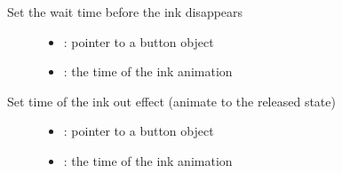 \documentclass[letterpaper,10pt,english]{sphinxmanual}
\begin{document}

\begin{fulllineitems}
\label{\detokenize{object-types/btn:_CPPv424lv_btn_set_ink_wait_timeP8lv_obj_t8uint16_t}}%
\pysigstartmultiline
{}\label{\detokenize{object-types/btn:lv__btn_8h_1ae450d6a9e090dc5fb8a60a9e1ccdc28b}}%
\pysigstopmultiline
Set the wait time before the ink disappears \begin{description}
\item[{}] \leavevmode\begin{itemize}
\item {} 
: pointer to a button object 

\item {} 
: the time of the ink animation 

\end{itemize}

\end{description}


\end{fulllineitems}


\begin{fulllineitems}
\label{\detokenize{object-types/btn:_CPPv423lv_btn_set_ink_out_timeP8lv_obj_t8uint16_t}}%
\pysigstartmultiline
{}\label{\detokenize{object-types/btn:lv__btn_8h_1a7f4273f23b996fd75b8f5602c8bcc5a4}}%
\pysigstopmultiline
Set time of the ink out effect (animate to the released state) \begin{description}
\item[{}] \leavevmode\begin{itemize}
\item {} 
: pointer to a button object 

\item {} 
: the time of the ink animation 

\end{itemize}

\end{description}


\end{fulllineitems}
\end{document}
